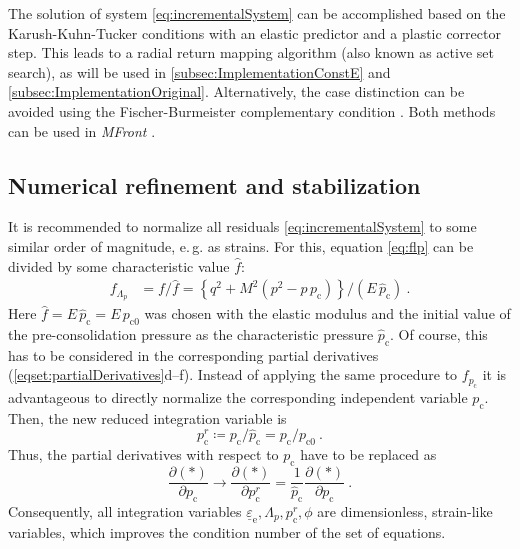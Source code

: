 \documentclass[paper=a4, twoside, pagesize]{scrartcl}
\newcommand{\tensor}[1]{\underline{#1}}
\renewcommand{\c}{\text{c}}
\newcommand{\e}{\text{e}}
\newcommand{\p}{\text{p}}
\begin{document}
The solution of system \eqref{eq:incrementalSystem} can be accomplished based on the Karush-Kuhn-Tucker conditions with an elastic predictor and a plastic corrector step. This leads to a radial return mapping algorithm (also known as active set search), as will be used in \autoref{subsec:ImplementationConstE} and \ref{subsec:ImplementationOriginal}. Alternatively, the case distinction can be avoided using the Fischer-Burmeister complementary condition \cite[cf. e.\,g.][]{Ashrafi2016,Bartel2019}. Both methods can be used in \textsl{MFront} \cite{Helfer2015,Helfer2020}.

\subsection{Numerical refinement and stabilization}\label{subsec:stabilization} %

It is recommended to normalize all residuals \eqref{eq:incrementalSystem} to some similar order of magnitude, e.\,g. as strains. For this, equation \eqref{eq:flp} can be divided by some characteristic value $\hat{f}$:
\begin{align}
  f_{\!\varLambda_p} &= f / \hat{f} = \left\{q^2 + M^2(p^2 - p\,p_\c)\right\} / (E\,\hat{p}_\c) \ .
\end{align}
Here $\hat{f} = E\,\hat{p}_\c = E\,p_{\c0}$ was chosen with the elastic modulus and the initial value of the pre-consolidation pressure as the characteristic pressure $\hat{p}_\c$. Of course, this has to be considered in the corresponding partial derivatives {(\ref{eqset:partialDerivatives}d--f)}.
Instead of applying the same procedure to $f_{p_\c}$ it is advantageous to directly normalize the corresponding independent variable $p_\c$. Then, the new reduced integration variable is
\begin{equation}
  p_\c^r\coloneqq p_\c / \hat{p}_\c = p_\c / p_{\c0} \ .
\end{equation}
Thus, the partial derivatives with respect to $p_\c$ have to be replaced as
\begin{equation}
  \frac{\partial (\ast)}{\partial p_\c} \rightarrow \frac{\partial (\ast)}{\partial p_\c^r} = \frac{1}{\hat{p}_\c} \frac{\partial (\ast)}{\partial p_\c} \ .
\end{equation}
Consequently, all integration variables $\tensor\varepsilon_\e, \varLambda_p, p_\c^r, \phi $ are dimensionless, strain-like variables, which improves the condition number of the set of equations.
\par
\end{document}
